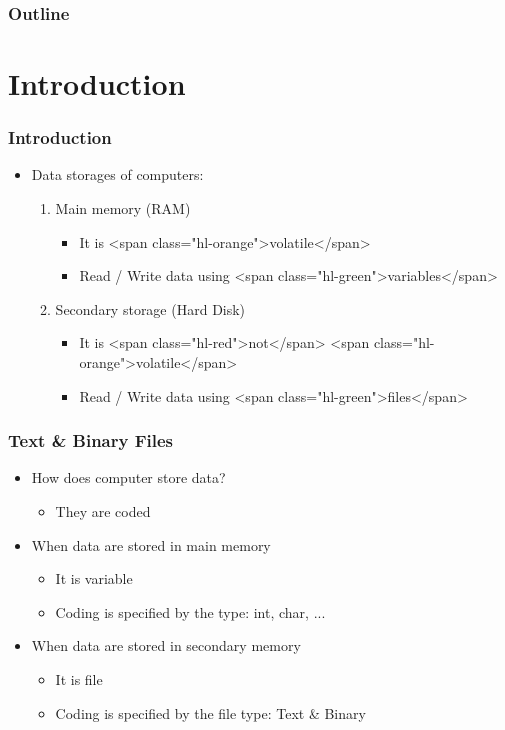 \documentclass{../c-lecture}
\subtitle{Files}
\begin{document}
\begin{frame}
  \titlepage{}
\end{frame}
\begin{frame}
  \frametitle{Outline}
  \tableofcontents{}
\end{frame}

\section{Introduction}

\begin{frame}
  \frametitle{Introduction}
  \begin{itemize}
    \item Data storages of computers:
    \begin{enumerate}
      \item Main memory (RAM)
      \begin{itemize}
        \item It is <span class="hl-orange">volatile</span>
        \item Read / Write data using <span class="hl-green">variables</span>
      \end{itemize}
      \item Secondary storage (Hard Disk)
      \begin{itemize}
        \item
          It is <span class="hl-red">not</span>
          <span class="hl-orange">volatile</span>

        \item Read / Write data using <span class="hl-green">files</span>
      \end{itemize}
    \end{enumerate}
  \end{itemize}
\end{frame}

\begin{frame}
  \frametitle{Text \& Binary Files}
  \begin{itemize}
    \item How does computer store data?
    \begin{itemize}
      \item They are coded
    \end{itemize}
    \item When data are stored in main memory
    \begin{itemize}
      \item It is variable
      \item Coding is specified by the type: int, char, ...
    \end{itemize}
    \item When data are stored in secondary memory
    \begin{itemize}
      \item It is file
      \item Coding is specified by the file type: Text \& Binary
    \end{itemize}
  \end{itemize}
\end{frame}
\end{document}
